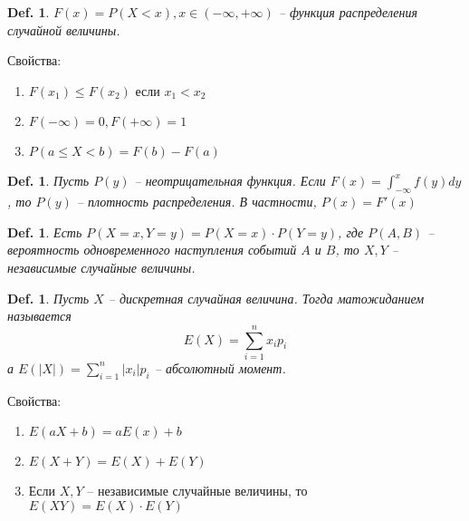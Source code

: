 \documentclass[12pt]{article}
\newenvironment{MyList}[1][4pt]{
  \begin{enumerate}[1.]
  \setlength{\parskip}{0pt}
  \setlength{\itemsep}{#1}
}{       
  \end{enumerate}
}
\theoremstyle{definition} %
\theoremstyle{plain} %
\newtheorem{Def}[Thm]{Def.} %
\theoremstyle{remark} %
\begin{document}
\begin{Def}
    $F(x) = P(X < x), x \in (-\infty, +\infty)$ -- функция распределения случайной величины. 
\end{Def}

Свойства:
\begin{MyList}
    \item $F(x_1) \leqslant F(x_2)$ если $x_1 < x_2$
    \item $F(-\infty) = 0, F(+\infty) = 1$
    \item $P(a \leqslant X < b) = F(b) - F(a)$   
\end{MyList}

\begin{Def}
    Пусть $P(y)$ -- неотрицательная функция. Если $F(x) = \int_{-\infty}^{x}f(y)dy$, то $P(y)$ -- плотность распределения.
    В частности, $P(x) = F'(x)$  
\end{Def}

\begin{Def}
    Есть $P(X = x, Y = y) = P(X = x) \cdot P(Y = y)$, где $P(A, B)$ -- вероятность одновременного наступления событий $A$ и $B$, то $X, Y$ -- независимые случайные величины.
\end{Def}

\begin{Def}
    Пусть $X$ -- дискретная случайная величина. Тогда матожиданием называется
    \[E(X) = \sum_{i=1}^{n} x_i p_i\] 
    а $E(|X|) = \sum_{i=1}^{n} |x_i| p_i$ -- абсолютный момент. 
\end{Def}

Свойства:
\begin{MyList}
    \item $E(aX + b) = aE(x) + b$ 
    \item $E(X + Y) = E(X) + E(Y)$ 
    \item Если $X, Y$ -- независимые случайные величины, то $E(XY) = E(X) \cdot E(Y)$  
\end{MyList}
\end{document}
